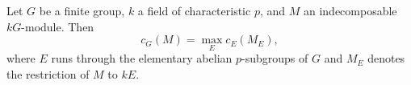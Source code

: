 Let $G$ be a finite group, $k$ a field of characteristic $p$, and $M$ an indecomposable $kG$-module. Then
\[
c_G(M) = \max_{E} c_E(M_E),
\]
where $E$ runs through the elementary abelian $p$-subgroups of $G$ and $M_E$ denotes the restriction of $M$ to $kE$.
